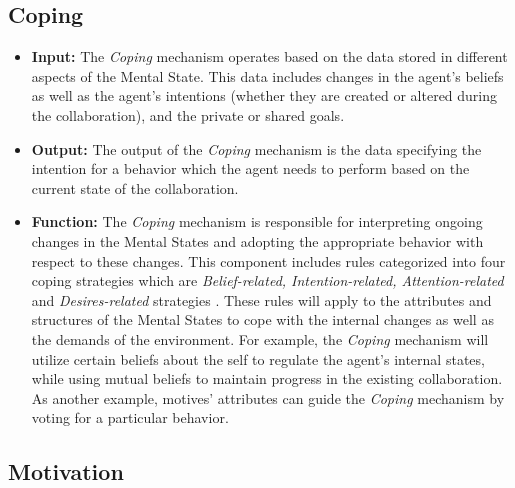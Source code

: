 \documentclass[12pt]{report}
\begin{document}
\subsection{Coping}

\begin{itemize}
  \item \textbf{Input:} The \textit{Coping} mechanism operates based on the data
  stored in different aspects of the Mental State. This data includes changes
  in the agent's beliefs as well as the agent's intentions (whether they are
  created or altered during the collaboration), and the private or shared goals.
  
  \item \textbf{Output:} The output of the \textit{Coping} mechanism is the data
  specifying the intention for a behavior which the agent needs to perform based
  on the current state of the collaboration.
  
  \item \textbf{Function:} The \textit{Coping} mechanism is responsible for
  interpreting ongoing changes in the Mental States and adopting the appropriate
  behavior with respect to these changes. This component includes rules
  categorized into four coping strategies which are \textit{Belief-related,
  Intention-related, Attention-related} and \textit{Desires-related} strategies
  \cite{marsella:ema-process-model}. These rules will apply to the attributes
  and structures of the Mental States to cope with the internal changes as well
  as the demands of the environment. For example, the \textit{Coping} mechanism
  will utilize certain beliefs about the self to regulate the agent's internal
  states, while using mutual beliefs to maintain progress in the existing
  collaboration. As another example, motives' attributes can guide the
  \textit{Coping} mechanism by voting for a particular behavior.
\end{itemize}

\subsection{Motivation}
\label{section-motivation-mechanism}
\end{document}

